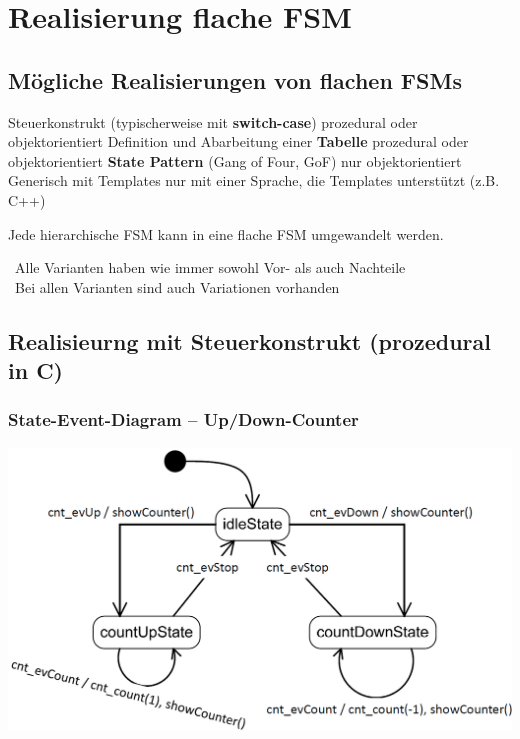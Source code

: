 \section{Realisierung flache FSM}

\subsection{Mögliche Realisierungen von flachen FSMs}

\begin{outline}
    \1 Steuerkonstrukt (typischerweise mit \textbf{switch-case})
        \2 prozedural oder objektorientiert
    \1 Definition und Abarbeitung einer \textbf{Tabelle}
        \2 prozedural oder objektorientiert
    \1 \textbf{State Pattern} (Gang of Four, GoF)
        \2 nur objektorientiert
    \1 Generisch mit Templates
        \2 nur mit einer Sprache, die Templates unterstützt (z.B. C++)
\end{outline}

\vspace{0.2cm}

Jede hierarchische FSM kann in eine flache FSM umgewandelt werden.
\vspace{0.1cm}

\textrightarrow\ Alle Varianten haben wie immer sowohl Vor- als auch Nachteile \\
\textrightarrow\ Bei allen Varianten sind auch Variationen vorhanden


\subsection{Realisieurng mit Steuerkonstrukt (prozedural in C)}

\subsubsection{State-Event-Diagram -- Up/Down-Counter}

\begin{center}
    \includegraphics[width=0.8\columnwidth]{images/fsm_up-down-counter_diagramm_C.png}
\end{center}


